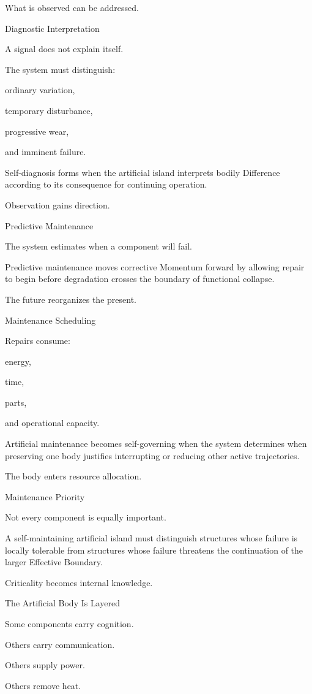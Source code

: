 What is observed can be addressed.

Diagnostic Interpretation

A signal does not explain itself.

The system must distinguish:

ordinary variation,

temporary disturbance,

progressive wear,

and imminent failure.

Self-diagnosis forms when the artificial island interprets bodily Difference according to its consequence for continuing operation.

Observation gains direction.

Predictive Maintenance

The system estimates when a component will fail.

Predictive maintenance moves corrective Momentum forward by allowing repair to begin before degradation crosses the boundary of functional collapse.

The future reorganizes the present.

Maintenance Scheduling

Repairs consume:

energy,

time,

parts,

and operational capacity.

Artificial maintenance becomes self-governing when the system determines when preserving one body justifies interrupting or reducing other active trajectories.

The body enters resource allocation.

Maintenance Priority

Not every component is equally important.

A self-maintaining artificial island must distinguish structures whose failure is locally tolerable from structures whose failure threatens the continuation of the larger Effective Boundary.

Criticality becomes internal knowledge.

The Artificial Body Is Layered

Some components carry cognition.

Others carry communication.

Others supply power.

Others remove heat.

